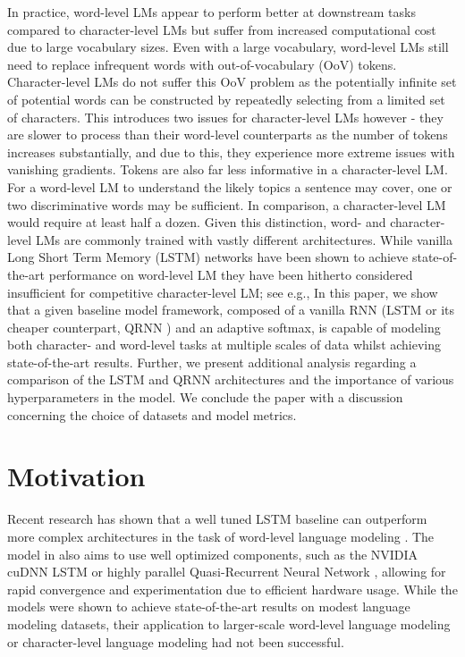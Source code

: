 \documentclass{article}
\begin{document}
In practice, word-level LMs appear to perform better at downstream tasks compared to character-level LMs but suffer from increased computational cost due to large vocabulary sizes.
Even with a large vocabulary, word-level LMs still need to replace infrequent words with out-of-vocabulary (OoV) tokens.
Character-level LMs do not suffer this OoV problem as the potentially infinite set of potential words can be constructed by repeatedly selecting from a limited set of characters.
This introduces two issues for character-level LMs however - they are slower to process than their word-level counterparts as the number of tokens increases substantially, and due to this, they experience more extreme issues with vanishing gradients.
Tokens are also far less informative in a character-level LM.
For a word-level LM to understand the likely topics a sentence may cover, one or two discriminative words may be sufficient.
In comparison, a character-level LM would require at least half a dozen.
Given this distinction, word- and character-level LMs are commonly trained with vastly different architectures.
While vanilla Long Short Term Memory (LSTM) networks have been shown to achieve state-of-the-art performance on word-level LM they have been hitherto considered insufficient for competitive character-level LM; see e.g., \cite{Melis2017}
In this paper, we show that a given baseline model framework, composed of a vanilla RNN (LSTM or its cheaper counterpart, QRNN \cite{Bradbury2016}) and an adaptive softmax, is capable of modeling both character- and word-level tasks at multiple scales of data whilst achieving state-of-the-art results.
Further, we present additional analysis regarding a comparison of the LSTM and QRNN architectures and the importance of various hyperparameters in the model. We conclude the paper with a discussion concerning the choice of datasets and model metrics. 

\section{Motivation}

Recent research has shown that a well tuned LSTM baseline can outperform more complex architectures in the task of word-level language modeling \citep{merity2018regularizing,Melis2017}. 
The model in \citet{merity2018regularizing} also aims to use well optimized components, such as the NVIDIA cuDNN LSTM or highly parallel Quasi-Recurrent Neural Network \citep{Bradbury2016}, allowing for rapid convergence and experimentation due to efficient hardware usage.
While the models were shown to achieve state-of-the-art results on modest language modeling datasets, their application to larger-scale word-level language modeling or character-level language modeling had not been successful.
\end{document}

